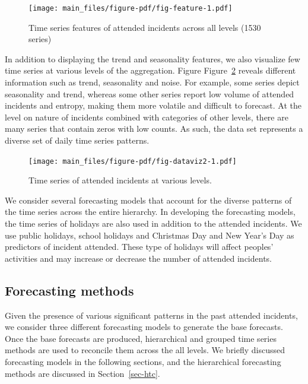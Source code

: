 \documentclass[
  authoryear,
  preprint,
  3p]{elsarticle}
\begin{document}
\begin{figure}

{\centering \texttt{[image: main\_files/figure-pdf/fig-feature-1.pdf]}

}

\caption{\label{fig-feature}Time series features of attended incidents
across all levels (1530 series)}

\end{figure}

In addition to displaying the trend and seasonality features, we also
visualize few time series at various levels of the aggregation. Figure
Figure~\ref{fig-dataviz2} reveals different information such as trend,
seasonality and noise. For example, some series depict seasonality and
trend, whereas some other series report low volume of attended incidents
and entropy, making them more volatile and difficult to forecast. At the
level on nature of incidents combined with categories of other levels,
there are many series that contain zeros with low counts. As such, the
data set represents a diverse set of daily time series patterns.

\begin{figure}

{\centering \texttt{[image: main\_files/figure-pdf/fig-dataviz2-1.pdf]}

}

\caption{\label{fig-dataviz2}Time series of attended incidents at
various levels.}

\end{figure}

We consider several forecasting models that account for the diverse
patterns of the time series across the entire hierarchy. In developing
the forecasting models, the time series of holidays are also used in
addition to the attended incidents. We use public holidays, school
holidays and Christmas Day and New Year's Day as predictors of incident
attended. These type of holidays will affect peoples' activities and may
increase or decrease the number of attended incidents.

\hypertarget{forecasting-methods}{%
\subsection{Forecasting methods}\label{forecasting-methods}}

Given the presence of various significant patterns in the past attended
incidents, we consider three different forecasting models to generate
the base forecasts. Once the base forecasts are produced, hierarchical
and grouped time series methods are used to reconcile them across the
all levels. We briefly discussed forecasting models in the following
sections, and the hierarchical forecasting methods are discussed in
Section~\ref{sec-htc}.
\end{document}
